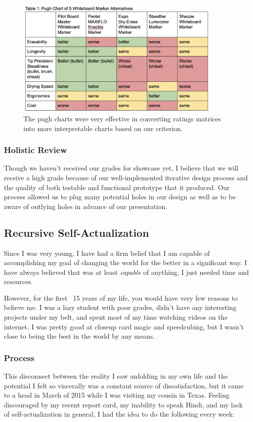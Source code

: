 \documentclass[a4paper,12pt]{article}
\begin{document}
\begin{figure}[H]
\centering
\includegraphics[width=0.9\textwidth]{img/image020.png}
\caption{The pugh charts were very effective in converting ratings matrices into more interpretable charts based on our criterion.}
\label{}
\end{figure}

\subsubsection{Holistic Review}
Though we haven’t received our grades for showcase yet, I believe that we will receive a high grade because of our well-implemented iterative design process and the quality of both testable and functional prototype that it produced. Our process allowed us to plug many potential holes in our design as well as to be aware of outlying holes in advance of our presentation.

\subsection{Recursive Self-Actualization}
Since I was very young, I have had a firm belief that I am capable of accomplishing my goal of changing the world for the better in a significant way. I have always believed that was at least \textit{capable} of anything, I just needed time and resources.

However, for the first ~15 years of my life, you would have very few reasons to believe me. I was a lazy student with poor grades, didn’t have any interesting projects under my belt, and spent most of my time watching videos on the internet. I was pretty good at closeup card magic and speedcubing, but I wasn’t close to being the best in the world by any means.


\subsubsection{Process}
This disconnect between the reality I saw unfolding in my own life and the potential I felt so viscerally was a constant source of dissatisfaction, but it came to a head in March of 2015 while I was visiting my cousin in Texas. Feeling discouraged by my recent report card, my inability to speak Hindi, and my lack of self-actualization in general, I had the idea to do the following every week:
\end{document}
